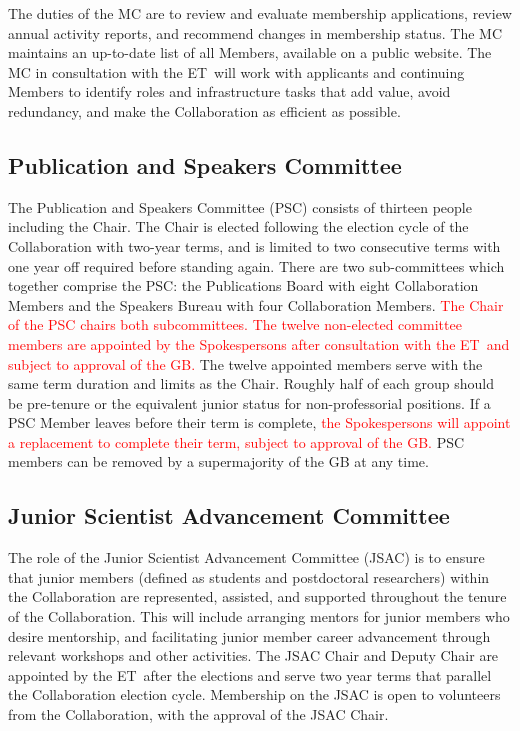 \documentclass[12pt]{article}
\newcommand{\exec}{{Executive Team}}
\newcommand{\shorte}{{ET}}  %
\begin{document}
The duties of the MC  are to review and evaluate membership applications, review annual activity reports, and recommend changes in membership status. The MC maintains an up-to-date list of all Members, available on a public website.  The MC in consultation with the \shorte\ will work with applicants and continuing Members to identify roles and infrastructure tasks that add value, avoid redundancy, and make the Collaboration as efficient as possible.  


\subsection{Publication and Speakers  Committee}
\label{sec:pubcouncil}
The Publication and Speakers Committee (PSC) consists of thirteen people including the Chair. The Chair is elected following the election cycle of the Collaboration with  two-year terms, and is limited to two consecutive terms with one year off required before standing again. There are two sub-committees which together comprise the PSC: the Publications Board with eight Collaboration Members and the Speakers Bureau with four Collaboration Members. \textcolor{red}{The Chair of the PSC chairs both subcommittees.} \textcolor{red}{The twelve non-elected committee members are appointed by the Spokespersons after consultation with the \shorte\ and subject to approval of the GB.} The twelve appointed members serve with the same {\color{red} term duration and limits as the Chair.}  Roughly half of each group should be pre-tenure {\color{red} or the equivalent junior status for non-professorial positions}. If a PSC Member leaves before their term is complete, \textcolor{red}{the Spokespersons will appoint a replacement to complete their term, subject to approval of the GB.}  PSC members can be removed by a supermajority of the GB at any time.  
 




\subsection{Junior Scientist Advancement Committee}

The role of the Junior Scientist Advancement Committee (JSAC) is to ensure that junior members (defined as students and postdoctoral researchers) within the Collaboration are represented, assisted, and supported throughout the  tenure of the Collaboration. This will include arranging mentors for junior members who desire mentorship, and facilitating junior member career advancement through relevant workshops and other activities. The JSAC Chair and Deputy Chair are appointed by the \shorte\ after the elections and serve two year terms that parallel the Collaboration election cycle. Membership on the JSAC is open to volunteers from the Collaboration, with the approval of the JSAC Chair. 
\end{document}
